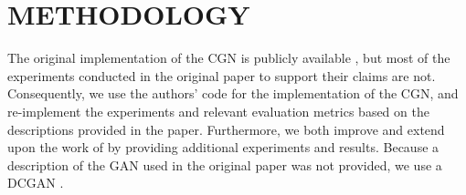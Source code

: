 \section{METHODOLOGY} \label{sec:methodology}
The original implementation of the CGN is publicly available \cite{cgn-github}, but most of the experiments conducted in the original paper to support their claims are not. Consequently, we use the authors' code for the implementation of the CGN, and re-implement the experiments and relevant evaluation metrics based on the descriptions provided in the paper. Furthermore, we both improve and extend upon the work of \citeauthor{Sauer2021ICLR} by providing additional experiments and results. Because a description of the GAN used in the original paper was not provided, we use a DCGAN \cite{dcgan-tutorial}.




